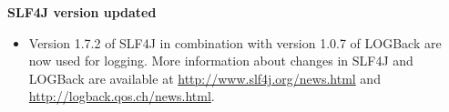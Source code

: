 \textbf{SLF4J version updated}
\begin{itemize}
\item Version 1.7.2 of SLF4J in combination with version 1.0.7 of LOGBack
    are now used for logging. More information about changes in SLF4J and
    LOGBack are available at
    \url{http://www.slf4j.org/news.html} and
    \url{http://logback.qos.ch/news.html}.
\end{itemize}
